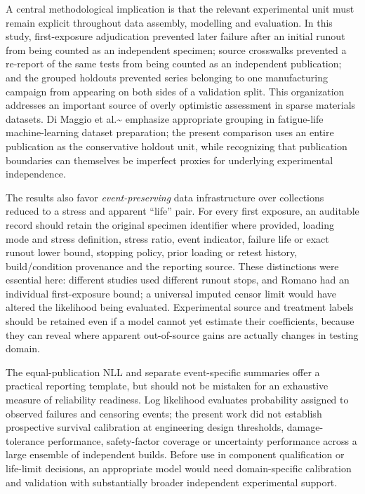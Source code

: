 \documentclass[12pt,a4paper]{article}
\begin{document}
A central methodological implication is that the relevant experimental unit must remain explicit throughout data assembly, modelling and evaluation. In this study, first-exposure adjudication prevented later failure after an initial runout from being counted as an independent specimen; source crosswalks prevented a re-report of the same tests from being counted as an independent publication; and the grouped holdouts prevented series belonging to one manufacturing campaign from appearing on both sides of a validation split. This organization addresses an important source of overly optimistic assessment in sparse materials datasets. Di Maggio et al.\textasciitilde{}\cite{dimaggio2025} emphasize appropriate grouping in fatigue-life machine-learning dataset preparation; the present comparison uses an entire publication as the conservative holdout unit, while recognizing that publication boundaries can themselves be imperfect proxies for underlying experimental independence.

The results also favor \emph{event-preserving} data infrastructure over collections reduced to a stress and apparent “life” pair. For every first exposure, an auditable record should retain the original specimen identifier where provided, loading mode and stress definition, stress ratio, event indicator, failure life or exact runout lower bound, stopping policy, prior loading or retest history, build/condition provenance and the reporting source. These distinctions were essential here: different studies used different runout stops, and Romano had an individual first-exposure bound; a universal imputed censor limit would have altered the likelihood being evaluated. Experimental source and treatment labels should be retained even if a model cannot yet estimate their coefficients, because they can reveal where apparent out-of-source gains are actually changes in testing domain.

The equal-publication NLL and separate event-specific summaries offer a practical reporting template, but should not be mistaken for an exhaustive measure of reliability readiness. Log likelihood evaluates probability assigned to observed failures and censoring events; the present work did not establish prospective survival calibration at engineering design thresholds, damage-tolerance performance, safety-factor coverage or uncertainty performance across a large ensemble of independent builds. Before use in component qualification or life-limit decisions, an appropriate model would need domain-specific calibration and validation with substantially broader independent experimental support.
\end{document}
